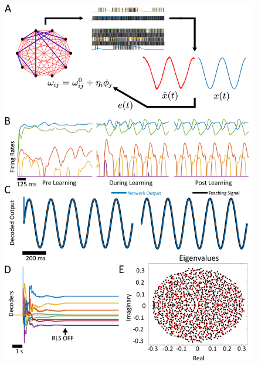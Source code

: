 \documentclass[11pt]{article} %
\begin{document}
\begin{figure}[htp!]
\centering
\includegraphics[scale=0.8]{FFIG1}
\caption{}\label{FORCE1}
\end{figure}
\end{document}
